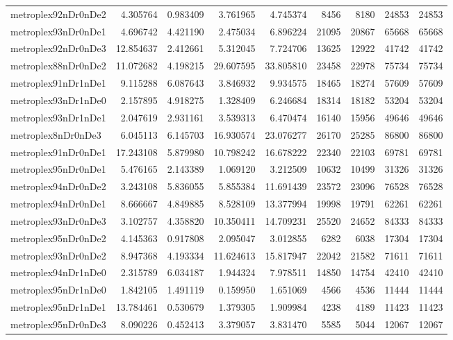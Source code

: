 \begin{longtable}{|l|r|r|r|r|r|r|r|r|}
metroplex92nDr0nDe2 & 4.305764 & 0.983409 & 3.761965 & 4.745374 & 8456 & 8180 & 24853 & 24853 \\
metroplex93nDr0nDe1 & 4.696742 & 4.421190 & 2.475034 & 6.896224 & 21095 & 20867 & 65668 & 65668 \\
metroplex92nDr0nDe3 & 12.854637 & 2.412661 & 5.312045 & 7.724706 & 13625 & 12922 & 41742 & 41742 \\
metroplex88nDr0nDe2 & 11.072682 & 4.198215 & 29.607595 & 33.805810 & 23458 & 22978 & 75734 & 75734 \\
metroplex91nDr1nDe1 & 9.115288 & 6.087643 & 3.846932 & 9.934575 & 18465 & 18274 & 57609 & 57609 \\
metroplex93nDr1nDe0 & 2.157895 & 4.918275 & 1.328409 & 6.246684 & 18314 & 18182 & 53204 & 53204 \\
metroplex93nDr1nDe1 & 2.047619 & 2.931161 & 3.539313 & 6.470474 & 16140 & 15956 & 49646 & 49646 \\
metroplex8nDr0nDe3 & 6.045113 & 6.145703 & 16.930574 & 23.076277 & 26170 & 25285 & 86800 & 86800 \\
metroplex91nDr0nDe1 & 17.243108 & 5.879980 & 10.798242 & 16.678222 & 22340 & 22103 & 69781 & 69781 \\
metroplex95nDr0nDe1 & 5.476165 & 2.143389 & 1.069120 & 3.212509 & 10632 & 10499 & 31326 & 31326 \\
metroplex94nDr0nDe2 & 3.243108 & 5.836055 & 5.855384 & 11.691439 & 23572 & 23096 & 76528 & 76528 \\
metroplex94nDr0nDe1 & 8.666667 & 4.849885 & 8.528109 & 13.377994 & 19998 & 19791 & 62261 & 62261 \\
metroplex93nDr0nDe3 & 3.102757 & 4.358820 & 10.350411 & 14.709231 & 25520 & 24652 & 84333 & 84333 \\
metroplex95nDr0nDe2 & 4.145363 & 0.917808 & 2.095047 & 3.012855 & 6282 & 6038 & 17304 & 17304 \\
metroplex93nDr0nDe2 & 8.947368 & 4.193334 & 11.624613 & 15.817947 & 22042 & 21582 & 71611 & 71611 \\
metroplex94nDr1nDe0 & 2.315789 & 6.034187 & 1.944324 & 7.978511 & 14850 & 14754 & 42410 & 42410 \\
metroplex95nDr1nDe0 & 1.842105 & 1.491119 & 0.159950 & 1.651069 & 4566 & 4536 & 11444 & 11444 \\
metroplex95nDr1nDe1 & 13.784461 & 0.530679 & 1.379305 & 1.909984 & 4238 & 4189 & 11423 & 11423 \\
metroplex95nDr0nDe3 & 8.090226 & 0.452413 & 3.379057 & 3.831470 & 5585 & 5044 & 12067 & 12067 \\

\end{longtable}
